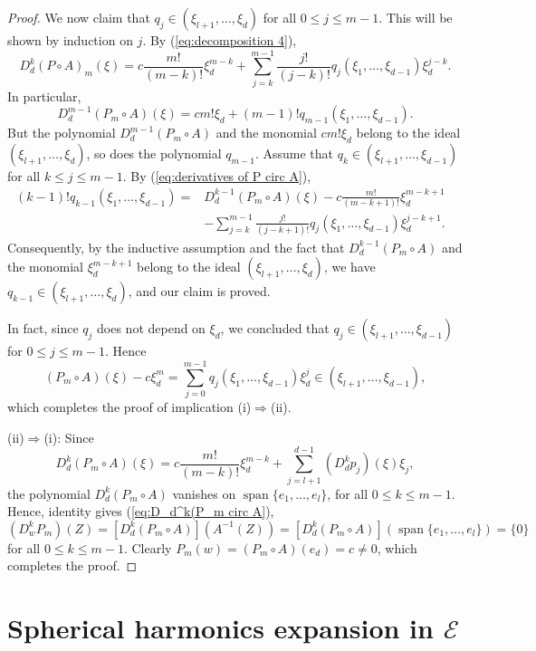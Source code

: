 \documentclass[a4paper,10pt]{amsart}
\newtheorem*{crucial lemma}{Lemma \ref{lem:nice polynomial2}}
\theoremstyle{definition}
\begin{document}
\begin{proof}
We now claim that $q_j\in (\xi_{l+1},\ldots,\xi_d)$ for all $0\leq j\leq m-1$. This will be shown by induction on $j$.
By (\ref{eq:decomposition 4}),
\begin{equation}\label{eq:derivatives of P circ A}
D_d^k(P\circ A)_m(\xi)=c\frac{m!}{(m-k)!}\xi_d^{m-k}+\sum_{j=k}^{m-1}\frac{j!}{(j-k)!}q_j(\xi_1,\ldots,\xi_{d-1})\xi_d^{j-k}.
\end{equation}
In particular, 
\[D_d^{m-1}(P_m\circ A)(\xi)=cm!\xi_d+(m-1)!q_{m-1}(\xi_1,\ldots,\xi_{d-1}).\]
But the polynomial $D_d^{m-1}(P_m\circ A)$ and the monomial $cm!\xi_d$ belong to the ideal $(\xi_{l+1},\ldots,\xi_d)$, so does the polynomial $q_{m-1}$. 
Assume that $q_k\in (\xi_{l+1},\ldots,\xi_{d-1})$ for all $k\leq j\leq m-1$. By (\ref{eq:derivatives of P circ A}),
\begin{align*}
(k-1)!q_{k-1}(\xi_1,\ldots,\xi_{d-1})=&D_d^{k-1}(P_m\circ A)(\xi)-c\frac{m!}{(m-k+1)!}\xi_d^{m-k+1}&\\
&-\sum_{j=k}^{m-1}\frac{j!}{(j-k+1)!}q_j(\xi_1,\ldots,\xi_{d-1})\xi_d^{j-k+1}.
\end{align*}
Consequently, by the inductive assumption and the fact that $D_d^{k-1}(P_m\circ A)$ and the monomial $\xi_d^{m-k+1}$ belong to the ideal $(\xi_{l+1},\ldots,\xi_d)$, we have $q_{k-1}\in (\xi_{l+1},\ldots,\xi_d)$, and our claim is proved. 

In fact, since $q_j$ does not depend on $\xi_d$, we concluded that $q_j\in (\xi_{l+1},\ldots,\xi_{d-1})$ for $0\leq j\leq m-1$. Hence
\[(P_m\circ A)(\xi)-c\xi_d^m=\sum_{j=0}^{m-1}q_j(\xi_1,\ldots,\xi_{d-1})\xi_d^j\in (\xi_{l+1},\ldots,\xi_{d-1}),\]
which completes the proof of implication (i)$\Rightarrow$(ii).

(ii)$\Rightarrow$(i): Since  
\[D_d^{k}(P_m\circ A)(\xi)=c\frac{m!}{(m-k)!}\xi_d^{m-k}+\sum_{j=l+1}^{d-1}(D_d^kp_j)(\xi)\xi_j,\]
the polynomial $D_d^{k}(P_m\circ A)$ vanishes on $\operatorname{span}\{e_1,\ldots,e_l\}$, for all $0\leq k\leq m-1$. Hence,  identity gives
(\ref{eq:D_d^k(P_m circ A}), 
\[(D_w^{k} P_m)(Z)=[D_d^{k}(P_m\circ A)](A^{-1}(Z))=[D_d^{k}(P_m\circ A)](\operatorname{span}\{e_1,\ldots,e_l\})=\{0\}\]
for all $0\leq k\leq m-1$.
Clearly $P_m(w)=(P_m\circ A)(e_d)=c\neq 0$, which completes the proof.
\end{proof}

\section{Spherical harmonics expansion in \texorpdfstring{$\mathscr{E}$}{E}}\label{appendix: spherical harmonics}
\end{document}
